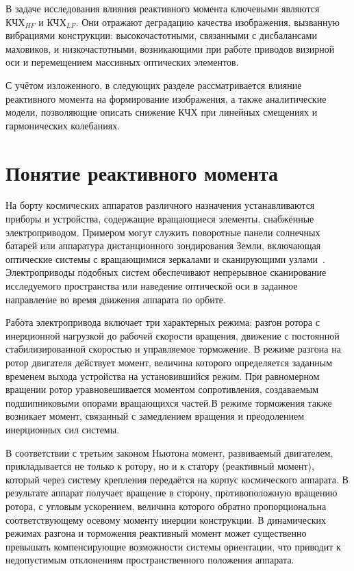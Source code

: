 В задаче исследования влияния реактивного момента ключевыми являются \(\text{КЧХ}_{HF}\) и \(\text{КЧХ}_{LF}\). Они отражают деградацию качества изображения, вызванную вибрациями конструкции: высокочастотными, связанными с дисбалансами маховиков, и низкочастотными, возникающими при работе приводов визирной оси и перемещением массивных оптических элементов.

С учётом изложенного, в следующих разделе рассматривается влияние реактивного момента на формирование  изображения, а также аналитические модели, позволяющие описать снижение КЧХ при линейных смещениях и гармонических колебаниях.

	




\section{Понятие реактивного момента}

На борту космических аппаратов различного назначения устанавливаются приборы и устройства, содержащие вращающиеся элементы, снабжённые электроприводом. Примером могут служить поворотные панели солнечных батарей или аппаратура дистанционного зондирования Земли, включающая оптические системы с вращающимися зеркалами и сканирующими узлами~\cite{Pantenkov2022}. Электроприводы подобных систем обеспечивают непрерывное сканирование исследуемого пространства или наведение оптической оси в заданное направление во время движения аппарата по орбите.

Работа электропривода включает три характерных режима: разгон ротора с инерционной нагрузкой до рабочей скорости вращения, движение с постоянной стабилизированной скоростью и управляемое торможение. В режиме разгона на ротор двигателя действует момент, величина которого определяется заданным временем выхода устройства на установившийся режим. При равномерном вращении ротор уравновешивается моментом сопротивления, создаваемым подшипниковыми опорами вращающихся частей.В режиме торможения также возникает момент, связанный с замедлением вращения и преодолением инерционных сил системы.

В соответствии с третьим законом Ньютона момент, развиваемый двигателем, прикладывается не только к ротору, но и к статору (реактивный момент), который через систему крепления передаётся на корпус космического аппарата. В результате аппарат получает вращение в сторону, противоположную вращению ротора, с угловым ускорением, величина которого обратно пропорциональна соответствующему осевому моменту инерции конструкции. В динамических режимах разгона и торможения реактивный момент может существенно превышать компенсирующие возможности системы ориентации, что приводит к недопустимым отклонениям пространственного положения аппарата.

